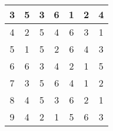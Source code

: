 \begin{table}[]
\begin{tabular}{|c|c|c|c|c|c|c|}
    3                                                        & 5                                                 & 3                                                 & 6                                                 & 1                                                 & 2                                                 & 4                                                 \\ \hline
    4                                                        & 2                                                 & 5                                                 & 4                                                 & 6                                                 & 3                                                 & 1                                                 \\ \hline
    5                                                        & 1                                                 & 5                                                 & 2                                                 & 6                                                 & 4                                                 & 3                                                 \\ \hline
    6                                                        & 6                                                 & 3                                                 & 4                                                 & 2                                                 & 1                                                 & 5                                                 \\ \hline
    7                                                        & 3                                                 & 5                                                 & 6                                                 & 4                                                 & 1                                                 & 2                                                 \\ \hline
    8                                                        & 4                                                 & 5                                                 & 3                                                 & 6                                                 & 2                                                 & 1                                                 \\ \hline
    9                                                        & 4                                                 & 2                                                 & 1                                                 & 5                                                 & 6                                                 & 3                                                 \\ \hline

\end{tabular}
\end{table}
